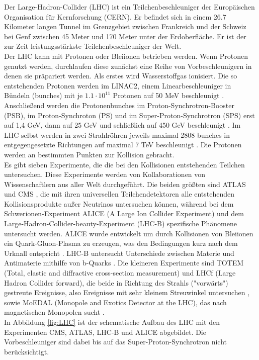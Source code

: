 Der Large-Hadron-Collider (LHC) ist ein Teilchenbeschleuniger der Europ\"aischen Organisation f\"ur Kernforschung (CERN). Er befindet sich in einem \num{26,7} Kilometer langen Tunnel im Grenzgebiet zwischen Frankreich und der Schweiz bei Genf zwischen \num{45} Meter und \num{170} Meter unter der Erdoberfl\"ache. Er ist der zur Zeit leistungsst\"arkste Teilchenbeschleuniger der Welt.\\
Der LHC kann mit Protonen oder Bleiionen betrieben werden. Wenn Protonen genutzt werden, durchlaufen diese zun\"achst eine Reihe von Vorbeschleunigern in denen sie pr\"apariert werden. Als erstes wird Wasserstoffgas ionisiert. Die so entstehenden Protonen werden im LINAC2, einem Linearbeschleuniger in B\"undeln (bunches) mit je $\num{1,1}\cdot\num{10}^{\num{11}}$ Protonen auf 50 MeV beschleunigt \cite{O'Luanaigh:1997427}. Anschlie\ss end werden die Protonenbunches im Proton-Synchrotron-Booster (PSB), im Proton-Synchroton (PS) und im Super-Proton-Synchrotron (SPS) erst auf 1,4 GeV, dann auf 25 GeV und schlie\ss lich auf 450 GeV beschleunigt \cite{O'Luanaigh:1997193}. Im LHC selbst werden in zwei Strahlr\"ohren jeweils maximal 2808 bunches in entgegengesetzte Richtungen auf maximal 7 TeV beschleunigt \cite{Lefevre:1165534}. Die Protonen werden an bestimmten Punkten zur Kollision gebracht. \\
Es gibt sieben Experimente, die die bei den Kollisionen entstehenden Teilchen untersuchen. Diese Experimente werden von Kollaborationen von Wissenschaftlern aus aller Welt durchgef\"uhrt. Die beiden gr\"o\ss ten sind ATLAS \cite{ATLAS} und CMS \cite{CMS}, die mit ihren universellen Teilchendetektoren alle entstehenden Kollisionsprodukte au\ss er Neutrinos untersuchen k\"onnen, w\"ahrend bei dem Schwerionen-Experiment ALICE (A Large Ion Collider Experiment) und dem Large-Hadron-Collider-beauty-Experiment (LHC-B) spezifische Ph\"anomene untersucht werden. ALICE wurde entwickelt um durch Kollisionen von Bleiionen ein Quark-Gluon-Plasma zu erzeugen, was den Bedingungen kurz nach dem Urknall entspricht \cite{ALICE}. LHC-B untersucht Unterschiede zwischen Materie und Antimaterie mithilfe von b-Quarks \cite{LHCb}. Die kleineren Experimente sind TOTEM (Total, elastic and diffractive cross-section measurement) und LHCf (Large Hadron Collider forward), die beide in Richtung des Strahls ("vorw\"arts") gestreute Ereignisse, also Ereignisse mit sehr kleinem Streuwinkel untersuchen \cite{LHCf,TOTEM}, sowie MoEDAL (Monopole and Exotics Detector at the LHC), das nach magnetischen Monopolen sucht \cite{MoEDAL}.\\%
In Abbildung \ref{fig:LHC} ist der schematische Aufbau des LHC mit den Experimenten CMS, ATLAS, LHC-B und ALICE abgebildet. Die Vorbeschleuniger sind dabei bis auf das Super-Proton-Synchrotron nicht ber\"ucksichtigt.

